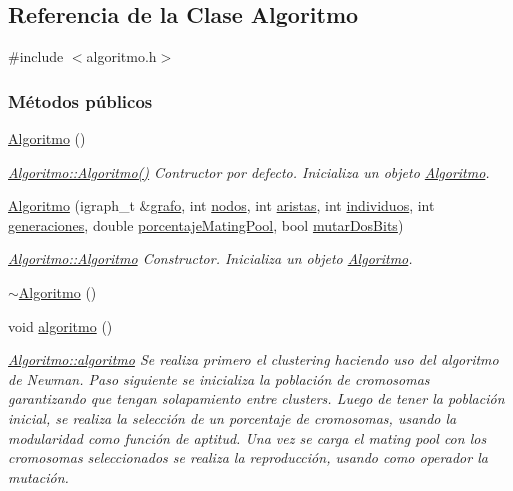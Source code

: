 \hypertarget{class_algoritmo}{\subsection{Referencia de la Clase Algoritmo}
\label{class_algoritmo}
}


{\ttfamily \#include $<$algoritmo.\-h$>$}

\subsubsection*{Métodos públicos}
\begin{DoxyCompactItemize}
\item 
\hyperlink{class_algoritmo_a19b6e2a6788c748669bf22507198c00d}{Algoritmo} ()
\begin{DoxyCompactList}\small\item\em \hyperlink{class_algoritmo_a19b6e2a6788c748669bf22507198c00d}{Algoritmo\-::\-Algoritmo()} Contructor por defecto. Inicializa un objeto \hyperlink{class_algoritmo}{Algoritmo}. \end{DoxyCompactList}\item 
\hyperlink{class_algoritmo_ae43b195db4527bb14eb4be2343908730}{Algoritmo} (igraph\-\_\-t \&\hyperlink{class_algoritmo_a5bf75458f302256836f8c021c696b6d6}{grafo}, int \hyperlink{class_algoritmo_a8b600a2b305e168f34896450a86330de}{nodos}, int \hyperlink{class_algoritmo_aebd547b83ffc0fc84727b4d32816e6a3}{aristas}, int \hyperlink{class_algoritmo_a5b2603327a6c450a76a6852ac26fe7a2}{individuos}, int \hyperlink{class_algoritmo_a76362b4a8f794e6206dcbeec3fe7a628}{generaciones}, double \hyperlink{class_algoritmo_a8423d3ea20137a281055f4b04f1d5492}{porcentaje\-Mating\-Pool}, bool \hyperlink{class_algoritmo_a128d4c2bd8d16eb3cb94f29f75ce33de}{mutar\-Dos\-Bits})
\begin{DoxyCompactList}\small\item\em \hyperlink{class_algoritmo_a19b6e2a6788c748669bf22507198c00d}{Algoritmo\-::\-Algoritmo} Constructor. Inicializa un objeto \hyperlink{class_algoritmo}{Algoritmo}. \end{DoxyCompactList}\item 
\hyperlink{class_algoritmo_a39b97924ace4107969fb6702b8ec11b7}{$\sim$\-Algoritmo} ()
\item 
void \hyperlink{class_algoritmo_a2af7a7e2b849e950a40edb29dbe48ee1}{algoritmo} ()
\begin{DoxyCompactList}\small\item\em \hyperlink{class_algoritmo_a2af7a7e2b849e950a40edb29dbe48ee1}{Algoritmo\-::algoritmo} Se realiza primero el {\itshape clustering} haciendo uso del algoritmo de Newman. Paso siguiente se inicializa la poblaci\'{o}n de cromosomas garantizando que tengan solapamiento entre {\itshape clusters}. Luego de tener la poblaci\'{o}n inicial, se realiza la selecci\'{o}n de un porcentaje de cromosomas, usando la modularidad como funci\'{o}n de aptitud. Una vez se carga el {\itshape mating pool} con los cromosomas seleccionados se realiza la reproducci\'{o}n, usando como operador la mutaci\'{o}n.\par

\end{DoxyCompactList}
\end{DoxyCompactItemize}
